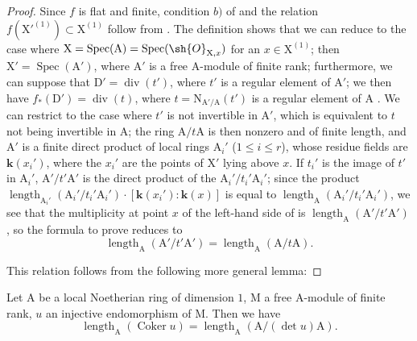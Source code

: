 \begin{proof}
Since $f$ is flat and finite, condition $b)$ of  and the relation $f(\mathrm{X}'^{(1)})\subset\mathrm{X}^{(1)}$ follow from .
The definition  shows that we can reduce to the case where $\mathrm{X}=\operatorname{Spec}(\mathrm{A})=\operatorname{Spec}(\sh{O}_{\mathrm{X},x})$ for an $x\in\mathrm{X}^{(1)}$; then $\mathrm{X}'=\operatorname{Spec}(\mathrm{A}')$, where $\mathrm{A}'$ is a free A-module of finite rank; furthermore, we can suppose that $\mathrm{D}'=\operatorname{div}(t')$, where $t'$ is a regular element of $\mathrm{A}'$; we then have $f_*(\mathrm{D}')=\operatorname{div}(t)$, where $t=\mathrm{N}_{\mathrm{A}'/\mathrm{A}}(t')$ is a regular element of $\mathrm{A}$ .
We can restrict to the case where $t'$ is not invertible in $\mathrm{A}'$, which is equivalent to $t$ not being invertible in $\mathrm{A}$; the ring $\mathrm{A}/t\mathrm{A}$ is then nonzero and of finite length, and $\mathrm{A}'$ is a finite direct product of local rings $\mathrm{A}_i'$ ($1\leq i\leq r$), whose residue fields are $\boldsymbol{k}(x_i')$, where the $x_i'$ are the points of $\mathrm{X}'$ lying above $x$.
If $t_i'$ is the image of $t'$ in $\mathrm{A}_i'$, $\mathrm{A}'/t'\mathrm{A}'$ is the direct product of the $\mathrm{A}_i'/t_i'\mathrm{A}_i'$; since the product $\operatorname{length}_{\mathrm{A}_i'}(\mathrm{A}_i'/t_i'\mathrm{A}_i')\cdot[\boldsymbol{k}(x_i'):\boldsymbol{k}(x)]$ is equal to $\operatorname{length}_{\mathrm{A}}(\mathrm{A}_i'/t_i'\mathrm{A}_i')$, we see that the multiplicity at point $x$ of the left-hand side of  is $\operatorname{length}_{\mathrm{A}}(\mathrm{A}'/t'\mathrm{A}')$, so the formula to prove reduces to
\[
\label{IV.21.10.17.2}
  \operatorname{length}_{\mathrm{A}}(\mathrm{A}'/t'\mathrm{A}')=\operatorname{length}_{\mathrm{A}}(\mathrm{A}/t\mathrm{A}).
  \tag{21.10.17.2}
\]

This relation follows from the following more general lemma:
\end{proof}

\begin{lemma}[21.10.17.3]
\label{IV.21.10.17.3}
Let $\mathrm{A}$ be a local Noetherian ring of dimension $1$, $\mathrm{M}$ a free A-module of finite rank, $u$ an injective endomorphism of $\mathrm{M}$.
Then we have
\[
\label{IV.21.10.17.4}
  \operatorname{length}_{\mathrm{A}}(\operatorname{Coker} u)=\operatorname{length}_{\mathrm{A}}(\mathrm{A}/(\det u)\mathrm{A}).
  \tag{21.10.17.4}
\]
\end{lemma}

